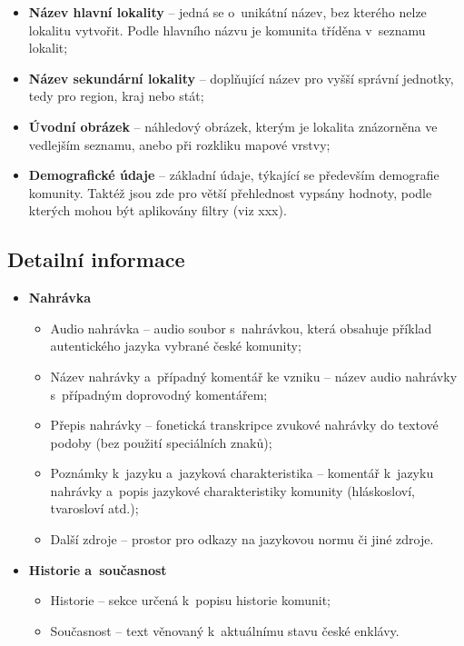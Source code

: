 \begin{itemize}
\tightlist
\item
  \textbf{Název hlavní lokality} -- jedná se o~unikátní název, bez kterého nelze lokalitu vytvořit. Podle hlavního názvu je komunita tříděna v~seznamu lokalit;
\item
  \textbf{Název sekundární lokality } -- doplňující název pro vyšší správní jednotky, tedy pro region, kraj nebo stát;
\item
  \textbf{Úvodní obrázek} -- náhledový obrázek, kterým je lokalita znázorněna ve vedlejším seznamu, anebo při rozkliku mapové vrstvy;
\item
  \textbf{Demografické údaje} -- základní údaje, týkající se především demografie komunity. Taktéž jsou zde pro větší přehlednost vypsány hodnoty, podle kterých mohou být aplikovány filtry (viz xxx).
\end{itemize}

\hypertarget{detailnuxed-informace}{%
\subsection{Detailní informace}\label{detailnuxed-informace}}

\begin{itemize}
\tightlist
\item
  \textbf{Nahrávka}

  \begin{itemize}
  \tightlist
  \item
    Audio nahrávka -- audio soubor s~nahrávkou, která obsahuje příklad autentického jazyka vybrané české komunity;
  \item
    Název nahrávky a~případný komentář ke vzniku -- název audio nahrávky s~případným doprovodný komentářem;
  \item
    Přepis nahrávky -- fonetická transkripce zvukové nahrávky do textové podoby (bez použití speciálních znaků);
  \item
    Poznámky k~jazyku a~jazyková charakteristika -- komentář k~jazyku nahrávky a~popis jazykové charakteristiky komunity (hláskosloví, tvarosloví atd.);
  \item
    Další zdroje -- prostor pro odkazy na jazykovou normu či jiné zdroje.
  \end{itemize}
\item
  \textbf{Historie a~současnost}

  \begin{itemize}
  \tightlist
  \item
    Historie -- sekce určená k~popisu historie komunit;
  \item
    Současnost -- text věnovaný k~aktuálnímu stavu české enklávy.
  \end{itemize}
\end{itemize}

